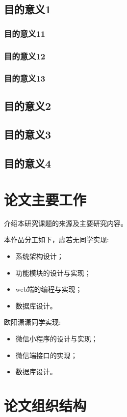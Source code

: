 \subsection{目的意义1}
\subsubsection{目的意义11}
\subsubsection{目的意义12}
\subsubsection{目的意义13}
\subsection{目的意义2}
\subsection{目的意义3}
\subsection{目的意义4}

\section{论文主要工作}
介绍本研究课题的来源及主要研究内容。

本作品分工如下，虚若无同学实现:
\begin{itemize}
	\item 系统架构设计；
	\item 功能模块的设计与实现；
	\item web端的编程与实现；
	\item 数据库设计。
\end{itemize}

欧阳潇潇同学实现:
\begin{itemize}
	\item 微信小程序的设计与实现；
	\item 微信端接口的实现；
	\item 数据库设计。
\end{itemize}

\section{论文组织结构}

